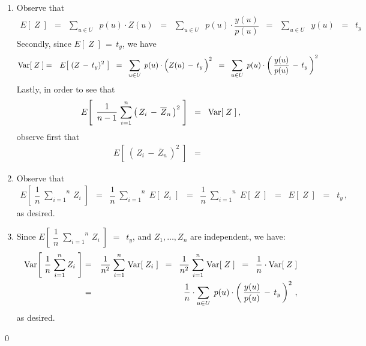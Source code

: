\begin{enumerate}
\item
	Observe that
	\begin{eqnarray*}
	E\!\left[\;Z\;\right]
	&=&
		\underset{u \in U}{\sum}\;\; p(u) \cdot Z(u)
	\;\; = \;\;
		\underset{u \in U}{\sum}\;\; p(u) \cdot \dfrac{y(u)}{p(u)}
	\;\; = \;\;
		\underset{u \in U}{\sum}\;\; y(u)
	\;\; = \;\;
		t_{y}
	\end{eqnarray*}
	Secondly, since \;$E\!\left[\;Z\;\right] \,=\, t_{y}$,\; we have
	\begin{eqnarray*}
	\Var\!\left[\;Z\;\right]
	&=&
		E\!\left[\;(Z\,-\,t_{y})^{2}\;\right]	
	\;\; = \;\;
		\underset{u \in U}{\sum}\;\, p(u)\cdot\left(\overset{{\color{white}.}}{Z}(u)\,-\,t_{y}\,\right)^{2}
	\;\; = \;\;
		\underset{u \in U}{\sum}\;\, p(u)\cdot\left(\,\dfrac{y(u)}{p(u)}\,-\,t_{y}\,\right)^{2}
	\end{eqnarray*}
	Lastly, in order to see that
	\begin{eqnarray*}
	E\!\left[\;\,\dfrac{1}{n-1}\;\overset{n}{\underset{i=1}{\sum}}\left(\,Z_{i} \,-\, \overline{Z}_{n}\,\right)^{2}\;\right]
	\;\; = \;\;
		\textnormal{Var}\!\left[\;Z\;\right],
	\end{eqnarray*}
	observe first that
	\begin{eqnarray*}
	E\!\left[\;\left(\,Z_{i} \,-\, \overline{Z}_{n}\,\right)^{2}\;\right]
	\;\; = \;\;
	\end{eqnarray*}
\item
	Observe that
	\begin{eqnarray*}
	E\!\left[\;\dfrac{1}{n}\;\overset{n}{\underset{i=1}{\sum}}\,Z_{i}\;\right]
	&=&
		\dfrac{1}{n}\;\overset{n}{\underset{i=1}{\sum}}\;E\!\left[\;Z_{i}\;\right]
	\;\; = \;\;
		\dfrac{1}{n}\;\overset{n}{\underset{i=1}{\sum}}\;E\!\left[\;Z\;\right]
	\;\; = \;\;
		E\!\left[\;Z\;\right]
	\;\; = \;\;
		t_{y}\,,
	\end{eqnarray*}
	as desired.
\item
	Since \;$E\!\left[\;\dfrac{1}{n}\;\overset{n}{\underset{i=1}{\sum}}\,Z_{i}\;\right]$ $=$\, $t_{y}$,\;
	and \;$Z_{1}, \ldots, Z_{n}$\; are independent, we have:
	\begin{eqnarray*}
	\textnormal{Var}\!\left[\;\dfrac{1}{n}\;\overset{n}{\underset{i=1}{\sum}}\,Z_{i}\;\right]
	&=&
		\dfrac{1}{n^{2}}\;\overset{n}{\underset{i=1}{\sum}}\;\textnormal{Var}\!\left[\;Z_{i}\;\right]
	\;\; = \;\;
		\dfrac{1}{n^{2}}\;\overset{n}{\underset{i=1}{\sum}}\;\textnormal{Var}\!\left[\;Z\;\right]
	\;\; = \;\;
		\dfrac{1}{n}\cdot\textnormal{Var}\!\left[\;Z\;\right]
	\\
	&=&
		\dfrac{1}{n}\cdot
		\underset{u \in U}{\sum}\;\, p(u)\cdot\left(\,\dfrac{y(u)}{p(u)}\,-\,t_{y}\,\right)^{2}\,,
	\end{eqnarray*}
	as desired.
\end{enumerate}
\qed


\renewcommand{\theenumi}{\roman{enumi}}
\renewcommand{\labelenumi}{\textnormal{(\theenumi)}$\;\;$}

